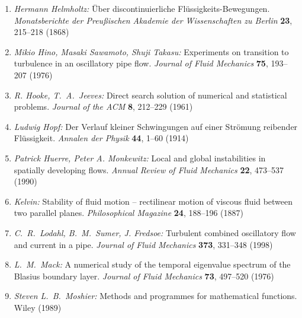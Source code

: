 \documentclass[10pt,a5paper,oneside,draft]{book}
\numberwithin{equation}{chapter}
\begin{document}
\begin{enumerate}
	\item \textsl{Hermann Helmholtz:} {\"U}ber discontinuierliche {F}l{\"u}ssigkeits-{B}ewegungen. \textit{Monatsberichte der Preu{\ss}ischen Akademie der Wissenschaften zu Berlin} \textbf{23}, 215--218 (1868)\bibfill\pageref{bib:helmholtz_fluessigkeit}
	\item \textsl{Mikio Hino, Masaki Sawamoto, Shuji Takasu:} Experiments on transition to turbulence in an oscillatory pipe flow. \textit{Journal of Fluid Mechanics} \textbf{75}, 193--207 (1976)\bibfill\pageref{bib:hino_sawamoto}
	\item \textsl{R. Hooke, T.~A.~Jeeves:} Direct search solution of numerical and statistical problems. \textit{Journal of the ACM} \textbf{8}, 212--229 (1961)\bibfill\pageref{bib:hooke_jeeves}
	\item \textsl{Ludwig Hopf:} {D}er {V}erlauf kleiner {S}chwingungen auf einer {S}tr{\"o}mung reibender {F}l{\"u}ssigkeit. \textit{Annalen der Physik} \textbf{44}, 1--60 (1914)\bibfill\pageref{bib:hopf}
	\item \textsl{Patrick Huerre, Peter A. Monkewitz:} Local and global instabilities in spatially developing flows. \textit{Annual Review of Fluid Mechanics} \textbf{22}, 473--537 (1990)\bibfill\pageref{bib:huerre_monkewitz}
	\item \textsl{Kelvin:} Stability of fluid motion -- rectilinear motion of viscous fluid between two parallel planes. \textit{Philosophical Magazine} \textbf{24}, 188--196 (1887)\bibfill\pageref{bib:kelvin}
	\item \textsl{C.~R.~Lodahl, B.~M.~Sumer, J. Fredsoe:} Turbulent combined oscillatory flow and current in a pipe. \textit{Journal of Fluid Mechanics} \textbf{373}, 331--348 (1998)\bibfill\pageref{bib:lodahl_sumer}
	\item \textsl{L.~M.~Mack:} A numerical study of the temporal eigenvalue spectrum of the {B}lasius boundary layer. \textit{Journal of Fluid Mechanics} \textbf{73}, 497--520 (1976)\bibfill\pageref{bib:mack}
	\item \textsl{Steven L.~B.~Moshier:} Methods and programmes for mathematical functions. Wiley (1989)\bibfill\pageref{bib:moshier}

\end{enumerate}
\end{document}
